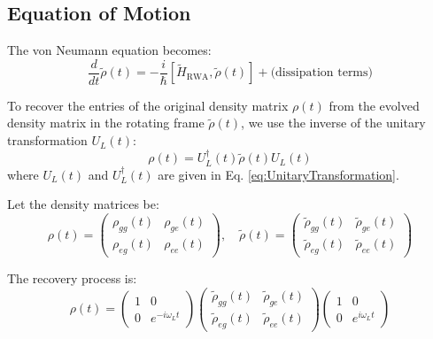 \subsection*{Equation of Motion}

The von Neumann equation becomes:
\begin{equation}
	\frac{d}{dt} \tilde{\rho}(t) = -\frac{i}{\hbar} [\tilde{H}_{\text{RWA}}, \tilde{\rho}(t)] + \text{(dissipation terms)}
	\label{eq:VonNeumannEquationRWA}
\end{equation}

To recover the entries of the original density matrix \(\rho(t)\) from the evolved density matrix in the rotating frame \(\tilde{\rho}(t)\), we use the inverse of the unitary transformation \(U_L(t)\):
\begin{equation}
	\rho(t) = U_L^\dagger(t) \tilde{\rho}(t) U_L(t)
	\label{eq:RecoverOriginalDensityMatrix}
\end{equation}
where \(U_L(t)\) and \(U_L^\dagger(t)\) are given in Eq. \eqref{eq:UnitaryTransformation}.

Let the density matrices be:
\begin{equation}
	\rho(t) =
	\begin{pmatrix}
		\rho_{gg}(t) & \rho_{ge}(t) \\
		\rho_{eg}(t) & \rho_{ee}(t)
	\end{pmatrix}, \quad
	\tilde{\rho}(t) =
	\begin{pmatrix}
		\tilde{\rho}_{gg}(t) & \tilde{\rho}_{ge}(t) \\
		\tilde{\rho}_{eg}(t) & \tilde{\rho}_{ee}(t)
	\end{pmatrix}
	\label{eq:DensityMatrices}
\end{equation}

The recovery process is:
\begin{equation}
	\rho(t) =
	\begin{pmatrix}
		1 & 0              \\
		0 & e^{-i\omega_L t}
	\end{pmatrix}
	\begin{pmatrix}
		\tilde{\rho}_{gg}(t) & \tilde{\rho}_{ge}(t) \\
		\tilde{\rho}_{eg}(t) & \tilde{\rho}_{ee}(t)
	\end{pmatrix}
	\begin{pmatrix}
		1 & 0             \\
		0 & e^{i\omega_L t}
	\end{pmatrix}
	\label{eq:RecoveryProcess}
\end{equation}

